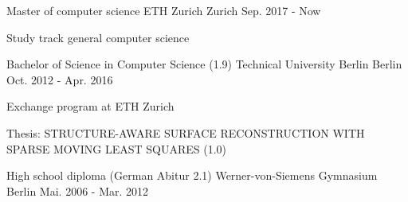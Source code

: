 

\begin{cventries}

  \cventry
    {Master of computer science} %
    {ETH Zurich} %
    {Zurich} %
    {Sep. 2017 - Now} %
    {
      \begin{cvitems} %
        \item {Study track general computer science}
      \end{cvitems}
    }


  \cventry
    {Bachelor of Science in Computer Science (1.9)} %
    {Technical University Berlin} %
    {Berlin} %
    {Oct. 2012 - Apr. 2016} %
    {
      \begin{cvitems} %
        \item {Exchange program at ETH Zurich}
        \item {Thesis: STRUCTURE-AWARE SURFACE RECONSTRUCTION WITH SPARSE MOVING LEAST SQUARES (1.0)}
      \end{cvitems}
    }


  \cventry
    {High school diploma (German Abitur 2.1)} %
    {Werner-von-Siemens Gymnasium} %
    {Berlin} %
    {Mai. 2006 - Mar. 2012} %
    {}

\end{cventries}
